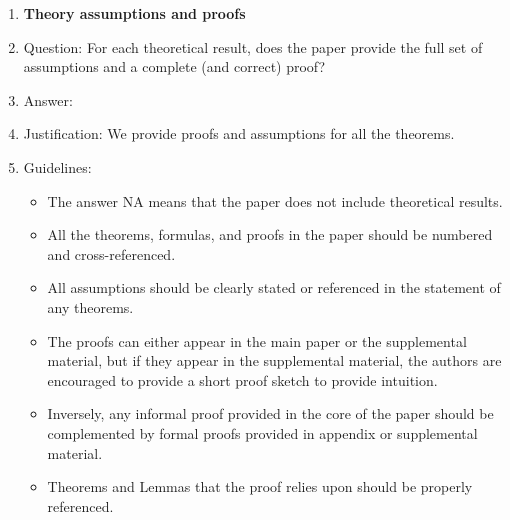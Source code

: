 \documentclass{article}
\theoremstyle{remark}
\begin{document}
\begin{enumerate}
\item {\bf Theory assumptions and proofs}
    \item[] Question: For each theoretical result, does the paper provide the full set of assumptions and a complete (and correct) proof?
    \item[] Answer: \answerYes{} %
    \item[] Justification: We provide proofs and assumptions for all the theorems. 
    \item[] Guidelines:
    \begin{itemize}
        \item The answer NA means that the paper does not include theoretical results. 
        \item All the theorems, formulas, and proofs in the paper should be numbered and cross-referenced.
        \item All assumptions should be clearly stated or referenced in the statement of any theorems.
        \item The proofs can either appear in the main paper or the supplemental material, but if they appear in the supplemental material, the authors are encouraged to provide a short proof sketch to provide intuition. 
        \item Inversely, any informal proof provided in the core of the paper should be complemented by formal proofs provided in appendix or supplemental material.
        \item Theorems and Lemmas that the proof relies upon should be properly referenced. 
    \end{itemize}


\end{enumerate}
\end{document}
